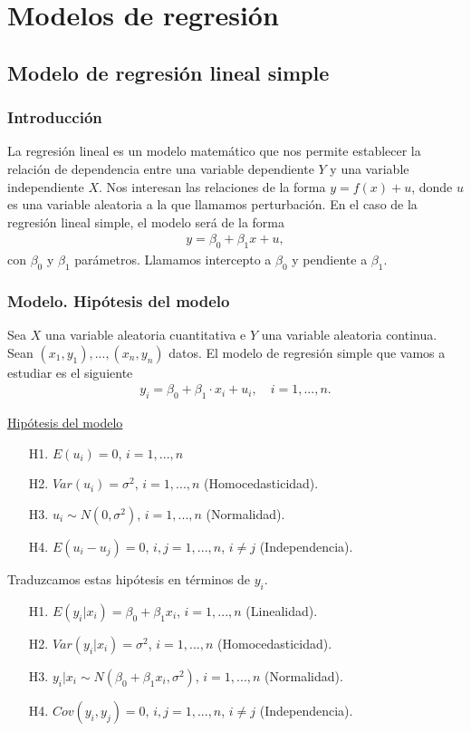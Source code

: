 \part{Modelos de regresión}

\chapter{Modelo de regresión lineal simple}

\section{Introducción}
La regresión lineal es un modelo matemático que nos permite establecer la relación de dependencia entre una variable dependiente $Y$ y una variable independiente $X$. Nos interesan las relaciones de la forma $y = f(x) + u$, donde $u$ es una variable aleatoria a la que llamamos perturbación.
En el caso de la regresión lineal simple, el modelo será de la forma
\begin{align*}
    y = \beta_0 + \beta_1x + u,
\end{align*}
con $\beta_0$ y $\beta_1$ parámetros.
Llamamos intercepto a $\beta_0$ y pendiente a $\beta_1$.

\section{Modelo. Hipótesis del modelo}
Sea $X$ una variable aleatoria cuantitativa e $Y$ una variable aleatoria continua. Sean $(x_1,y_1),...,(x_n,y_n)$ datos. El modelo de regresión simple que vamos a estudiar es el siguiente
\begin{align*}
    y_i = \beta_0 + \beta_1 \cdot x_i + u_i, \quad i = 1,...,n.
\end{align*}

\underline{Hipótesis del modelo}

\begin{enumerate}
    \item[H1.] $E(u_i) = 0$, $i=1,...,n$
    \item[H2.] $Var(u_i) = \sigma^2$, $i=1,...,n$ (Homocedasticidad).
    \item[H3.] $u_i \sim N(0,\sigma^2)$, $i=1,...,n$ (Normalidad).
    \item[H4.] $E(u_i - u_j) = 0$, $i,j=1,...,n$, $i \not = j$ (Independencia).
\end{enumerate}
Traduzcamos estas hipótesis en términos de $y_i$.

\begin{enumerate}
    \item[H1.] $E(y_i | x_i) = \beta_0 + \beta_1 x_i$, $i=1,...,n$ (Linealidad).
    \item[H2.] $Var(y_i | x_i) = \sigma^2$, $i=1,...,n$ (Homocedasticidad).
    \item[H3.] $y_i | x_i \sim N(\beta_0 + \beta_1 x_i, \sigma^2)$, $i=1,...,n$ (Normalidad).
    \item[H4.] $Cov(y_i,y_j) = 0$, $i,j=1,...,n$, $i \not = j$ (Independencia).
\end{enumerate}

